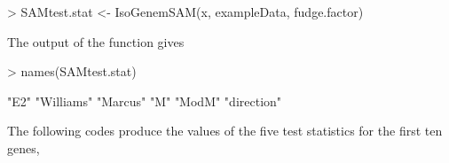 \documentclass[10pt]{article}
\begin{document}
\begin{Schunk}
\begin{Sinput}
> SAMtest.stat <- IsoGenemSAM(x, exampleData, fudge.factor)
\end{Sinput}
\end{Schunk}

The output of the function gives

\begin{Schunk}
\begin{Sinput}
> names(SAMtest.stat)
\end{Sinput}
\begin{Soutput}
[1] "E2"        "Williams"  "Marcus"    "M"         "ModM"      "direction"
\end{Soutput}
\end{Schunk}

The following codes produce the values of the five test statistics for the first ten genes,
\end{document}
